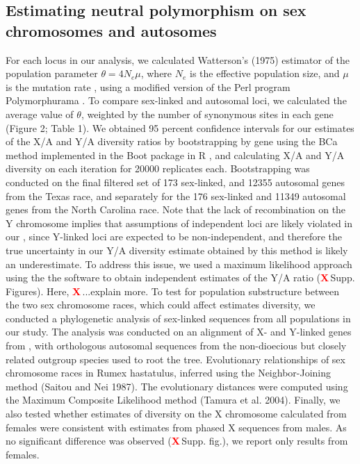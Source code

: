 \documentclass[9pt,twocolumn,twoside]{gsajnl}
\newcommand{\X}{\textcolor{red}{\bf X\,}}
\begin{document}
\subsection*{Estimating neutral polymorphism on sex chromosomes and autosomes}
For each locus in our analysis, we calculated Watterson’s (1975) estimator of the population parameter $\theta=4N_{e}\mu$, where $N_{e}$ is the effective population size, and $\mu$ is the mutation rate \citep{watterson1975}, using a modified version of the Perl program Polymorphurama \citep{bachtrog2006}. To compare sex-linked and autosomal loci, we calculated the average value of $\theta$, weighted by the number of synonymous sites in each gene (Figure 2; Table 1). We obtained 95 percent confidence intervals for our estimates of the X/A and Y/A diversity ratios by bootstrapping by gene using the BCa method \citep{efron1994} implemented in the Boot package in R \citep{canty2012boot}, and calculating X/A and Y/A diversity on each iteration for 20000 replicates each. Bootstrapping was conducted on the final filtered set of 173 sex-linked, and 12355 autosomal genes from the Texas race, and separately for the 176 sex-linked and 11349 autosomal genes from the North Carolina race. Note that the lack of recombination on the Y chromosome implies that assumptions of independent loci are likely violated in our , since Y-linked loci are expected to be non-independent, and therefore the true uncertainty in our Y/A diversity estimate obtained by this method is likely an underestimate. To address this issue, we used a maximum likelihood approach using the the software \citep{wright2004hka} to obtain independent estimates of the Y/A ratio (\X Supp. Figures). Here, \X{...explain more}.  
To test for population substructure between the two sex chromosome races, which could affect estimates diversity, we conducted a phylogenetic analysis of sex-linked sequences from all populations in our study. The analysis was conducted on an alignment of X- and Y-linked genes from , with orthologous autosomal sequences from the non-dioecious but closely related outgroup species  used to root the tree. Evolutionary relationships of sex chromosome races in Rumex hastatulus, inferred using the Neighbor-Joining method (Saitou and Nei 1987). The evolutionary distances were computed using the Maximum Composite Likelihood method (Tamura et al. 2004). 
Finally, we also tested whether estimates of diversity on the X chromosome calculated from females were consistent with estimates from phased X sequences from males. As no significant difference was observed (\X Supp. fig.), we report only results from females.
\end{document}
